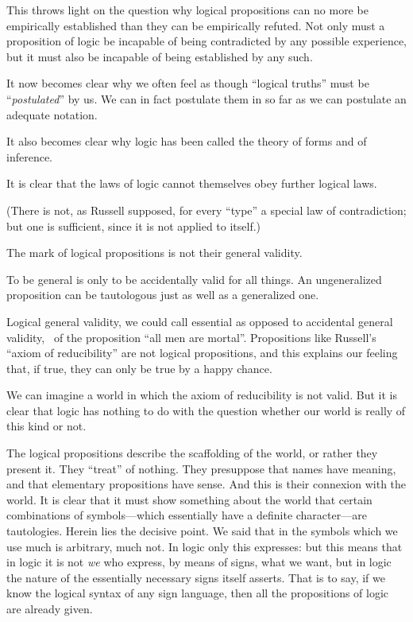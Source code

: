 {This throws light on the question why logical
propositions can no more be empirically established
than they can be empirically refuted. Not only
must a proposition of logic be incapable of being
contradicted by any possible experience, but it
must also be incapable of being established by any
such.}


{It now becomes clear why we often feel as though
``logical truths'' must be ``\emph{postulated}'' by us. We
can in fact postulate them in so far as we can
postulate an adequate notation.}


{It also becomes clear why logic has been called
the theory of forms and of inference.}


{It is clear that the laws of logic cannot themselves
obey further logical laws.

(There is not, as Russell supposed, for every
``type'' a special law of contradiction; but one is
sufficient, since it is not applied to itself.)}


{The mark of logical propositions is not their
general validity.

To be general is only to be accidentally valid
for all things. An ungeneralized proposition can
be tautologous just as well as a generalized
one.}


{Logical general validity, we could call essential
as opposed to accidental general validity, \exempliGratia\ of the
proposition ``all men are mortal''. Propositions
like Russell's ``axiom of reducibility'' are not
logical propositions, and this explains our feeling
that, if true, they can only be true by a happy
chance.}


{We can imagine a world in which the axiom of
reducibility is not valid. But it is clear that logic
has nothing to do with the question whether our
world is really of this kind or not.}


{The logical propositions describe the scaffolding
of the world, or rather they present it. They
``treat'' of nothing. They presuppose that names
have meaning, and that elementary propositions
have sense. And this is their connexion with the
world. It is clear that it must show something
about the world that certain combinations of symbols---which
essentially have a definite character---are
tautologies. Herein lies the decisive point. We
said that in the symbols which we use much is
arbitrary, much not. In logic only this expresses:
but this means that in logic it is not \emph{we} who express,
by means of signs, what we want, but in logic the
nature of the essentially necessary signs itself
asserts. That is to say, if we know the logical
syntax of any sign language, then all the propositions
of logic are already given.}


